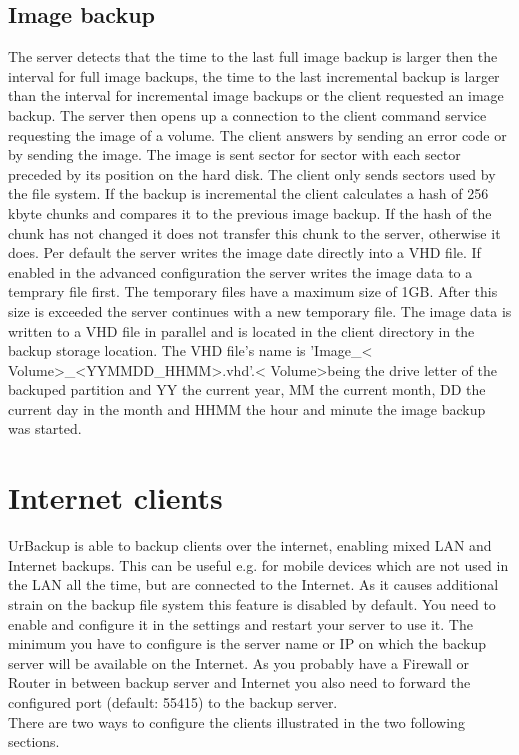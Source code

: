 \documentclass[a4paper,10pt]{article}
\begin{document}
\subsection{Image backup}

The server detects that the time to the last full image backup is larger then
the interval for full image backups, the time to the last incremental backup is
larger than the interval for incremental image backups or the client requested
an image backup. The server then opens up a connection to the client command
service requesting the image of a volume. The client answers by sending an error
code or by sending the image. The image is sent sector for sector with each
sector preceded by its position on the hard disk. The client only sends sectors
used by the file system. If the backup is incremental the client calculates a
hash of 256 kbyte chunks and compares it to the previous image backup. If the
hash of the chunk has not changed it does not transfer this chunk to the server,
otherwise it does. Per default the server writes the image date directly into
a VHD file. If enabled in the advanced configuration the server writes the image
data to a temprary file first. 
The temporary files have a maximum size of 1GB. After this size is exceeded the
server continues with a new temporary file. The image data is written to a VHD
file in parallel and is located in the client directory in
the backup storage location. The VHD file's name is 'Image\_\textless
Volume\textgreater\_\textless YYMMDD\_HHMM\textgreater.vhd'.\textless
Volume\textgreater  being the drive letter of the backuped partition and YY the
current year, MM the current month, DD the current day in the month and HHMM the
hour and minute the image backup was started.

\section{Internet clients}
\label{sec:internet_clients}

UrBackup is able to backup clients over the internet, enabling mixed LAN and
Internet backups. This can be useful e.g. for mobile devices which are not
used in the LAN all the time, but are connected to the Internet. As it causes
additional strain on the backup file system this feature is disabled by default.
You need to enable and configure it in the settings and restart your server to
use it. The minimum you have to configure is the server name or IP on which
the backup server will be available on the Internet. As you probably have a
Firewall or Router in between backup server and Internet you also need to forward
the configured port (default: 55415) to the backup server.\\
There are two ways to configure the clients illustrated in the two following sections.
\end{document}
